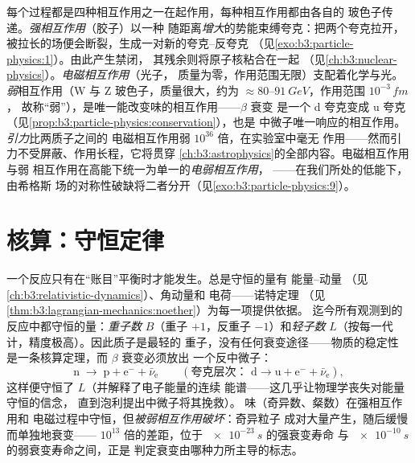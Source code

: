 \begin{remark}[四种相互作用]\label{rem:b3:particle-physics:forces}
每个过程都是四种相互作用之一在起作用，每种相互作用都由各自的
玻色子传递。\emph{强相互作用}（胶子）以一种
随距离\emph{增大}的势能束缚夸克：把两个夸克拉开，
被拉长的场便会断裂，生成一对新的夸克–反夸克
（见\cref{exo:b3:particle-physics:1}）。由此产生禁闭，
其残余则将原子核粘合在一起
（见\cref{ch:b3:nuclear-physics}）。\emph{电磁相互作用}（光子，
质量为零，作用范围无限）支配着化学与光。
\emph{弱}相互作用（W 与 Z 玻色子，质量很大，约为
$\approx80$--$\qty{91}{GeV}$，作用范围 $10^{-3}\,\unit{fm}$，
故称“弱”），是唯一能改变味的相互作用——$\beta$ 衰变
是一个 d 夸克变成 u 夸克
（见\cref{prop:b3:particle-physics:conservation}），也是
中微子唯一响应的相互作用。\emph{引力}比两质子之间的
电磁相互作用弱 $10^{36}$ 倍，在实验室中毫无
作用——然而引力不受屏蔽、作用长程，它将贯穿
\cref{ch:b3:astrophysics}的全部内容。电磁相互作用与弱
相互作用在高能下统一为单一的\emph{电弱相互作用}，
——在我们所处的低能下，由希格斯
场的对称性破缺将二者分开（见\cref{exo:b3:particle-physics:9}）。
\end{remark}

\section{核算：守恒定律}

\begin{proposition}[粒子反应的守恒定律]\label{prop:b3:particle-physics:conservation}
一个反应只有在“账目”平衡时才能发生。总是守恒的量有
能量–动量
（见\cref{ch:b3:relativistic-dynamics}）、角动量和
电荷——诺特定理
（见\cref{thm:b3:lagrangian-mechanics:noether}）为每一项提供依据。
迄今所有观测到的反应中都守恒的量：\emph{重子数}
$B$（重子 $+1$，反重子 $-1$）和\emph{轻子数}
$L$（按每一代计，精度极高）。因此质子是最轻的
重子，没有任何衰变途径——物质的稳定性
是一条核算定理，而 $\beta$ 衰变必须放出
一个反中微子：
\[
\text{n} \;\to\; \text{p} + \text{e}^- + \bar\nu_{\text{e}}
\qquad (\text{夸克层次： } \text{d} \to \text{u} +
\text{e}^- + \bar\nu_{\text{e}}) ,
\]
这样便守恒了 $L$（并解释了电子能量的连续
能谱——这几乎让物理学丧失对能量守恒的信念，
直到泡利提出中微子将其挽救）。
味（奇异数、粲数）在强相互作用和
电磁过程中守恒，但\emph{被弱相互作用破坏}：奇异粒子
成对大量产生，随后缓慢而单独地衰变——
$10^{13}$ 倍的差距，位于 $\qty{e-23}{s}$ 的强衰变寿命
与 $\qty{e-10}{s}$ 的弱衰变寿命之间，正是
判定衰变由哪种力所主导的标志。
\end{proposition}
\admitted

